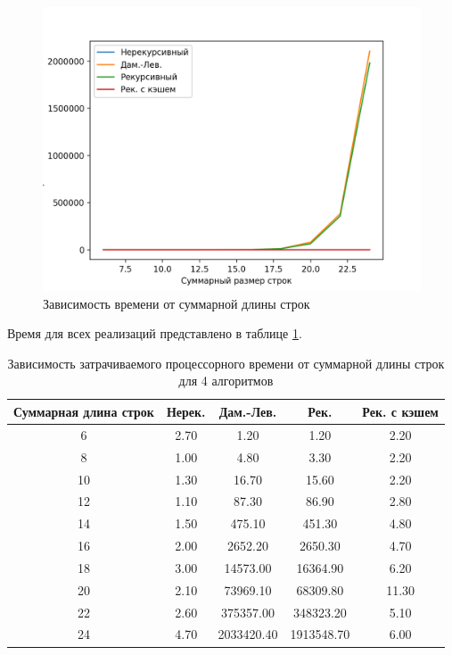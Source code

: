 \documentclass{report}
\begin{document}
\begin{figure}[h!p]\label{1}
	\centering
	\includegraphics[scale = 0.85]{gr.png}
	\caption{Зависимость времени от суммарной длины строк}
	\label{fig:mpr5}
\end{figure}

\newpage

Время для всех реализаций представлено в таблице \ref{tb:times}.

\begin{table}[h!p]
	\begin{center}
		\caption{\label{tbl:test}Зависимость затрачиваемого процессорного времени от суммарной длины строк для 4 алгоритмов}
		\label{tb:times}
		\begin{tabular}{|c|c|c|c|c|}
			\hline
			Суммарная длина строк & Нерек. & Дам.-Лев. & Рек. & Рек. с кэшем  \\ 
			\hline
            6 & 2.70 & 1.20 & 1.20 & 2.20  \\ 
            \hline
            8 & 1.00 & 4.80 & 3.30 & 2.20  \\ 
            \hline
            10 & 1.30 & 16.70 & 15.60 & 2.20  \\ 
            \hline
            12 & 1.10 & 87.30 & 86.90 & 2.80  \\ 
            \hline
            14 & 1.50 & 475.10 & 451.30 & 4.80  \\ 
            \hline
            16 & 2.00 & 2652.20 & 2650.30 & 4.70  \\ 
            \hline
            18 & 3.00 & 14573.00 & 16364.90 & 6.20  \\ 
            \hline
            20 & 2.10 & 73969.10 & 68309.80 & 11.30  \\ 
            \hline
            22 & 2.60 & 375357.00 & 348323.20 & 5.10  \\ 
            \hline
            24 & 4.70 & 2033420.40 & 1913548.70 & 6.00  \\ 
            \hline
		\end{tabular}
	\end{center}
\end{table}
\end{document}
